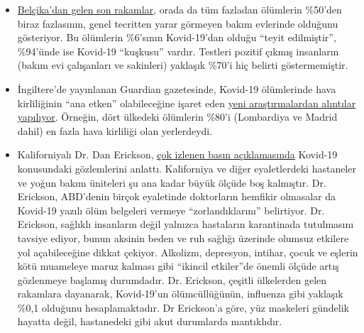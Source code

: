 \begin{itemize}
{  ayı ortasında yaptığı açıklamaya göre,} Lombardiya'daki bakım
  evlerinde 1800'den fazla insan ölmüştür ve birçok vakada ölüm nedeni
  hala açık değildir. Lombardiya'nın bazı bölgelerinde bulunan huzur
  evleri ve bakım evlerindeki bakımın, bunun sonucunda da tüm sağlık
  sisteminin, kısmen
  \href{https://swprs.org/covid-19-a-report-from-italy/}{virüs korkusu
  ve tecrit} nedeniyle, çökmüş olduğu zaten biliniyordu.
\item
  \href{https://covid-19.sciensano.be/sites/default/files/Covid19/Meest\%20recente\%20update.pdf}{Belçika'dan
  gelen son rakamlar}, orada da tüm fazladan ölümlerin \%50'den biraz
  fazlasının, genel tecritten yarar görmeyen bakım evlerinde olduğunu
  gösteriyor. Bu ölümlerin \%6'sının Kovid-19'dan olduğu ``teyit
  edilmiştir'', \%94'ünde ise Kovid-19 ``kuşkusu'' vardır. Testleri
  pozitif çıkmış insanların (bakım evi çalışanları ve sakinleri)
  yaklaşık \%70'i hiç belirti göstermemiştir.
\item
  İngiltere'de yayınlanan Guardian gazetesinde, Kovid-19 ölümlerinde
  hava kirliliğinin ``ana etken'' olabileceğine işaret eden
  \href{https://www.theguardian.com/environment/2020/apr/20/air-pollution-may-be-key-contributor-to-covid-19-deaths-study?utm_medium}{yeni
  araştırmalardan alıntılar yapılıyor}. Örneğin, dört ülkedeki ölümlerin
  \%80'i (Lombardiya ve Madrid dahil) en fazla hava kirliliği olan
  yerlerdeydi.
\item
  Kaliforniyalı Dr. Dan Erickson,
  \href{https://www.turnto23.com/news/coronavirus/video-interview-with-dr-dan-erickson-and-dr-artin-massihi-taken-down-from-youtube}{çok
  izlenen basın açıklamasında} Kovid-19 konusundaki gözlemlerini
  anlattı. Kaliforniya ve diğer eyaletlerdeki hastaneler ve yoğun bakım
  üniteleri şu ana kadar büyük ölçüde boş kalmıştır. Dr. Erickson,
  ABD'denin birçok eyaletinde doktorların hemfikir olmasalar da Kovid-19
  yazılı ölüm belgeleri vermeye ``zorlandıklarını'' belirtiyor. Dr.
  Erickson, sağlıklı insanların değil yalnızca hastaların karantinada
  tutulmasını tavsiye ediyor, bunun aksinin beden ve ruh sağlığı
  üzerinde olumsuz etkilere yol açabileceğine dikkat çekiyor. Alkolizm,
  depresyon, intihar, çocuk ve eşlerin kötü muameleye maruz kalması gibi
  ``ikincil etkiler''de önemli ölçüde artış gözlenmeye başlamış
  durumdadır. Dr. Erickson, çeşitli ülkelerden gelen rakamlara
  dayanarak, Kovid-19'un ölümcüllüğünün, influenza gibi yaklaşık \%0,1
  olduğunu hesaplamaktadır. Dr Erickson'a göre, yüz maskeleri gündelik
  hayatta değil, hastanedeki gibi akut durumlarda mantıklıdır.

\end{itemize}
